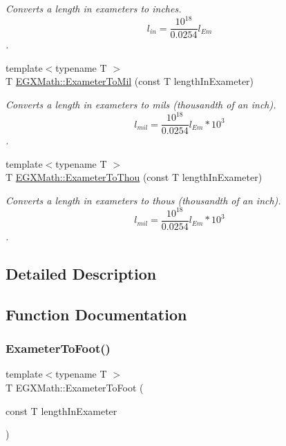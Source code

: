 \begin{DoxyCompactItemize}
\begin{DoxyCompactList}\small\item\em Converts a length in exameters to inches. \[ l_{in}= \frac{10^{18}}{0.0254} l_{Em} \]. \end{DoxyCompactList}\item 
{\footnotesize template$<$typename T $>$ }\\T \mbox{\hyperlink{group___e_g_x_math-_conversions-_length_conversions-_s_i-_exameter-_imperial_ga863f9f7f7e2826324fec642027c48614}{E\+G\+X\+Math\+::\+Exameter\+To\+Mil}} (const T length\+In\+Exameter)
\begin{DoxyCompactList}\small\item\em Converts a length in exameters to mils (thousandth of an inch). \[ l_{mil}= \frac{10^{18}}{0.0254} l_{Em} * 10^{3} \]. \end{DoxyCompactList}\item 
{\footnotesize template$<$typename T $>$ }\\T \mbox{\hyperlink{group___e_g_x_math-_conversions-_length_conversions-_s_i-_exameter-_imperial_gafee1930a425fcae4f9a3d8631aa62b05}{E\+G\+X\+Math\+::\+Exameter\+To\+Thou}} (const T length\+In\+Exameter)
\begin{DoxyCompactList}\small\item\em Converts a length in exameters to thous (thousandth of an inch). \[ l_{mil}= \frac{10^{18}}{0.0254} l_{Em} * 10^{3} \]. \end{DoxyCompactList}\end{DoxyCompactItemize}


\subsection{Detailed Description}


\subsection{Function Documentation}
\mbox{\label{group___e_g_x_math-_conversions-_length_conversions-_s_i-_exameter-_imperial_gac6057a24ad10c84b86ec52c9a37f916b}} 
\subsubsection{\texorpdfstring{Exameter\+To\+Foot()}{ExameterToFoot()}}
{\footnotesize\ttfamily template$<$typename T $>$ \\
T E\+G\+X\+Math\+::\+Exameter\+To\+Foot (\begin{DoxyParamCaption}\item[{const T}]{length\+In\+Exameter }\end{DoxyParamCaption})}



